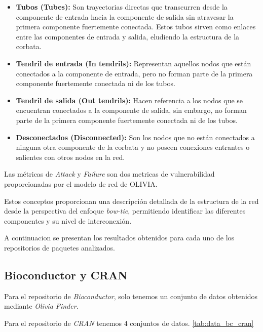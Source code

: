 \begin{itemize}
    \item \textbf{Tubos (Tubes):} Son trayectorias directas que transcurren desde la componente de entrada hacia la componente de salida sin atravesar la primera componente fuertemente conectada. Estos tubos sirven como enlaces entre las componentes de entrada y salida, eludiendo la estructura de la corbata.

    \item \textbf{Tendril de entrada (In tendrils):} Representan aquellos nodos que están conectados a la componente de entrada, pero no forman parte de la primera componente fuertemente conectada ni de los tubos.

    \item \textbf{Tendril de salida (Out tendrils):} Hacen referencia a los nodos que se encuentran conectados a la componente de salida, sin embargo, no forman parte de la primera componente fuertemente conectada ni de los tubos.

    \item \textbf{Desconectados (Disconnected):} Son los nodos que no están conectados a ninguna otra componente de la corbata y no poseen conexiones entrantes o salientes con otros nodos en la red.

\end{itemize}

Las métricas de \textit{Attack} y \textit{Failure} son dos metricas de vulnerabilidad proporcionadas por el modelo de red de OLIVIA. \cite{Seto-Rey20231}

Estos conceptos proporcionan una descripción detallada de la estructura de la red desde la perspectiva del enfoque \textit{bow-tie}, permitiendo identificar las diferentes componentes y su nivel de interconexión.

A continuacion se presentan los resultados obtenidos para cada uno de los repositorios de paquetes analizados.

\subsection{Bioconductor y CRAN}

Para el repositorio de \textit{Bioconductor}, solo tenemos un conjunto de datos obtenidos mediante \textit{Olivia Finder}.

Para el repositorio de \textit{CRAN} tenemos 4 conjuntos de datos. \ref{tab:data_bc_cran}

